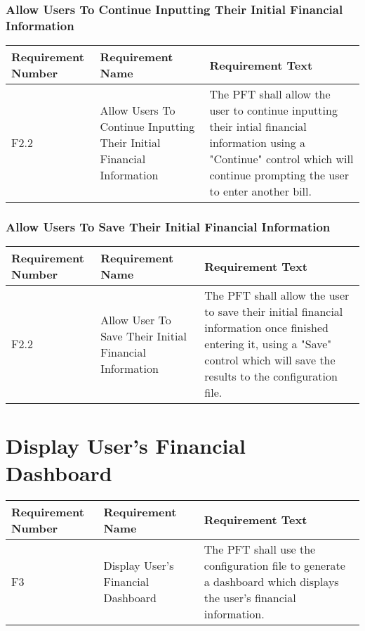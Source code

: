 \documentclass{article}
\begin{document}
\subsubsection{Allow Users To Continue Inputting Their Initial Financial Information}

\begin{longtable}{|p{2cm}|p{6cm}| p{6cm}|}
    \hline
    \textbf{Requirement Number} & \textbf{Requirement Name} & \textbf{Requirement Text}\\
    \hline
    F2.2 & Allow Users To Continue Inputting Their Initial Financial Information & The PFT shall allow the user to continue inputting their intial financial information using a "Continue" control which will continue prompting the user to enter another bill.  \\
    \hline
\end{longtable}

\subsubsection{Allow Users To Save Their Initial Financial Information}

\begin{longtable}{|p{2cm}|p{6cm}| p{6cm}|}
    \hline
    \textbf{Requirement Number} & \textbf{Requirement Name} & \textbf{Requirement Text}\\
    \hline
    F2.2 & Allow User To Save Their Initial Financial Information & The PFT shall allow the user to save their initial financial information once finished entering it, using a "Save" control which will save the results to the configuration file.  \\
    \hline
\end{longtable}

\section{Display User's Financial Dashboard}

\begin{longtable}{|p{2cm}|p{6cm}| p{6cm}|}
    \hline
    \textbf{Requirement Number} & \textbf{Requirement Name} & \textbf{Requirement Text}\\
    \hline
    F3 & Display User's Financial Dashboard & The PFT shall use the configuration file to generate a dashboard which displays the user's financial information. \\
    \hline
\end{longtable}
\end{document}
